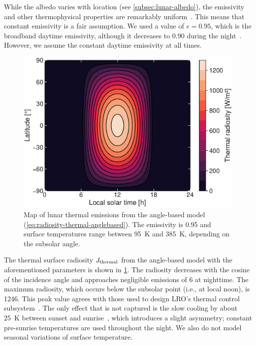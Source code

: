 While the albedo varies with location (see \cref{subsec:lunar-albedo}), the emissivity and other thermophysical properties are remarkably uniform~\cite{Hayne2017}. This means that constant emissivity is a fair assumption. We used a value of $e = 0.95$, which is the broadband daytime emissivity, although it decreases to 0.90 during the night~\cite{Bandfield2015}. However, we assume the constant daytime emissivity at all times.

\begin{figure}[t]
    \centering
    \includegraphics[width=\linewidth]{figures/plots/thermal_map.pdf}
    \caption{Map of lunar thermal emissions from the angle-based model (\cref{eq:radiosity-thermal-anglebased}). The emissivity is 0.95 and surface temperatures range between \qty{95}{\K} and \qty{385}{\K}, depending on the subsolar angle.}
    \label{fig:thermal-map}
\end{figure}

The thermal surface radiosity $J_\textnormal{thermal}$ from the angle-based model with the aforementioned parameters is shown in \cref{fig:thermal-map}. The radiosity decreases with the cosine of the incidence angle and approaches negligible emissions of \qty{6}{\irr} at nighttime. The maximum radiosity, which occurs below the subsolar point (i.e., at local noon), is \qty{1246}{\irr}. This peak value agrees with those used to design \gls{LRO}'s thermal control subsystem~\cite{Tooley2010}. The only effect that is not captured is the slow cooling by about \qty{25}{\K} between sunset and sunrise~\cite{Vasavada2012}, which introduces a slight asymmetry; constant pre-sunrise temperatures are used throughout the night. We also do not model seasonal variations of surface temperature.





